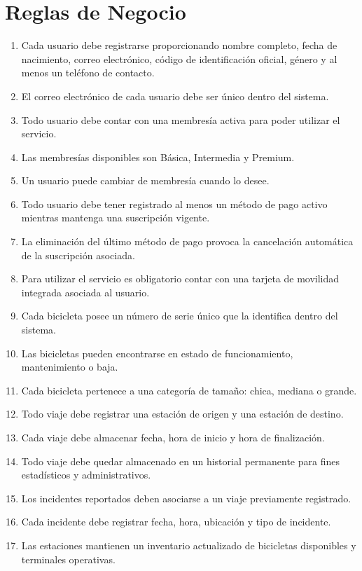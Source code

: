 \section{Reglas de Negocio}

\begin{enumerate}
	\item Cada usuario debe registrarse proporcionando nombre completo, fecha de nacimiento, correo electrónico, código de identificación oficial, género y al menos un teléfono de contacto.
	\item El correo electrónico de cada usuario debe ser único dentro del sistema.
	\item Todo usuario debe contar con una membresía activa para poder utilizar el servicio.
	\item Las membresías disponibles son Básica, Intermedia y Premium.
	\item Un usuario puede cambiar de membresía cuando lo desee.
	\item Todo usuario debe tener registrado al menos un método de pago activo mientras mantenga una suscripción vigente.
	\item La eliminación del último método de pago provoca la cancelación automática de la suscripción asociada.
	\item Para utilizar el servicio es obligatorio contar con una tarjeta de movilidad integrada asociada al usuario.
	\item Cada bicicleta posee un número de serie único que la identifica dentro del sistema.
	\item Las bicicletas pueden encontrarse en estado de funcionamiento, mantenimiento o baja.
	\item Cada bicicleta pertenece a una categoría de tamaño: chica, mediana o grande.
	\item Todo viaje debe registrar una estación de origen y una estación de destino.
	\item Cada viaje debe almacenar fecha, hora de inicio y hora de finalización.
	\item Todo viaje debe quedar almacenado en un historial permanente para fines estadísticos y administrativos.
	\item Los incidentes reportados deben asociarse a un viaje previamente registrado.
	\item Cada incidente debe registrar fecha, hora, ubicación y tipo de incidente.
	\item Las estaciones mantienen un inventario actualizado de bicicletas disponibles y terminales operativas.

\end{enumerate}
